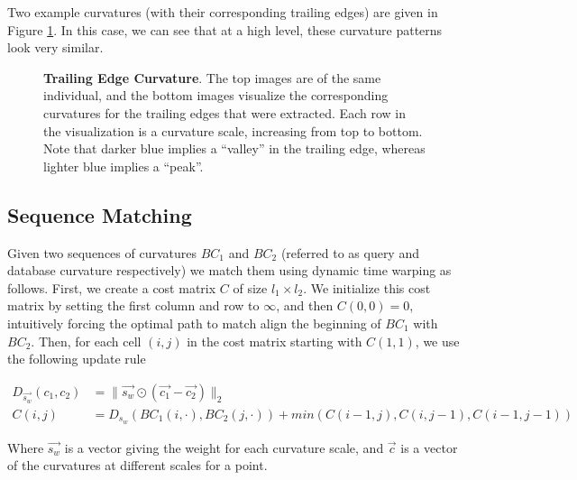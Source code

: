 Two example curvatures (with their corresponding trailing edges) are given in Figure \ref{fig:example_curv}.
In this case, we can see that at a high level, these curvature patterns look very similar.

\begin{figure}[t]%
\centering
{}
\newline
{}
\caption[]{\textbf{Trailing Edge Curvature}. The top images are of the same individual, and the bottom images visualize the corresponding curvatures for the trailing edges that were extracted. Each row in the visualization is a curvature scale, increasing from top to bottom. Note that darker blue implies a ``valley'' in the trailing edge, whereas lighter blue implies a ``peak''.}
\label{fig:example_curv}
\end{figure}




\subsection{Sequence Matching}

Given two sequences of curvatures $BC_1$ and $BC_2$ (referred to as query and database curvature respectively) we match them using dynamic time warping as follows.
First, we create a cost matrix $C$ of size $l_1 \times l_2$. 
We initialize this cost matrix by setting the first column and row to $\infty$, and then $C(0,0) = 0$, intuitively forcing the optimal path to match align the beginning of $BC_1$ with $BC_2$.
Then, for each cell $(i,j)$ in the cost matrix starting with $C(1,1)$, we use the following update rule

\begin{align} 
\label{eqn:dtw_dist}
D_{\vec{s_w}}(c_1, c_2) &= \lVert \vec{s_w} \odot (\vec{c_1} - \vec{c_2}) \rVert_2\\
\label{eqn:dtw_update}
C(i,j) &= D_{s_w}(BC_1(i,\cdot),BC_2(j,\cdot)) + min(C(i-1,j), C(i,j-1), C(i-1, j-1))
\end{align}

Where $\vec{s_w}$ is a vector giving the weight for each curvature scale, and $\vec{c}$ is a vector of the curvatures at different scales for a point.

